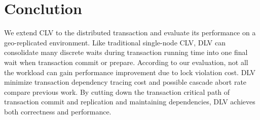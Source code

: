 \documentclass[conference]{IEEEtran}
\begin{document}
\section{Conclution}
\label{sec:conclution}
We extend CLV to the distributed transaction and evaluate its performance on a geo-replicated environment.
Like traditional single-node CLV, DLV can consolidate many discrete waits during transaction running time into one final wait when transaction commit or prepare.
According to our evaluation, not all the workload can gain performance improvement due to lock violation cost.
DLV minimize transaction dependency tracing cost and possible cascade abort rate compare previous work.
By cutting down the transaction critical path of transaction commit and replication and maintaining dependencies, DLV achieves both correctness and performance.




\end{document}
